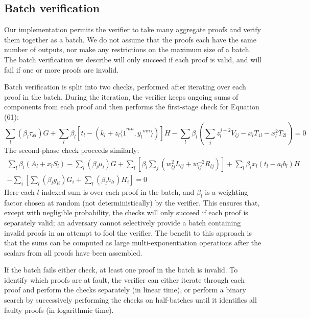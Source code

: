 \documentclass{mrl}
\begin{document}
\subsection{Batch verification}
Our implementation permits the verifier to take many aggregate proofs and verify them together as a batch. We do not assume that the proofs each have the same number of outputs, nor make any restrictions on the maximum size of a batch. The batch verification we describe will only succeed if each proof is valid, and will fail if one or more proofs are invalid.

Batch verification is split into two checks, performed after iterating over each proof in the batch. During the iteration, the verifier keeps ongoing sums of components from each proof and then performs the first-stage check for Equation (61):
\begin{equation}
\sum_l (\beta_l\tau_{xl}) G + \sum_l \beta_l\left[ t_l - (k_l + z_l \langle \overline{1}^{mn},\overline{y_l}^{mn} \rangle) \right] H - \sum_l \beta_l \left( \sum_j z_l^{j+2} V_{lj} - x_lT_{1l} - x_l^2T_{2l} \right) = 0 \nonumber
\end{equation}
The second-phase check proceeds similarly:
\begin{multline}
\sum_l \beta_l(A_l + x_lS_l) - \sum_l(\beta_l\mu_l) G + \sum_l\left[\beta_l \sum_j(w_{lj}^2 L_{lj} + w_{lj}^{-2} R_{lj})\right] + \sum_l \beta_l x_l(t_l - a_lb_l) H \\
- \sum_i \left[\sum_l(\beta_l g_{li})G_i + \sum_l(\beta_l h_{li})H_i\right] = 0 \nonumber
\end{multline}
Here each $l$-indexed sum is over each proof in the batch, and $\beta_l$ is a weighting factor chosen at random (not deterministically) by the verifier. This ensures that, except with negligible probability, the checks will only succeed if each proof is separately valid; an adversary cannot selectively provide a batch containing invalid proofs in an attempt to fool the verifier. The benefit to this approach is that the sums can be computed as large multi-exponentiation operations after the scalars from all proofs have been assembled.

If the batch fails either check, at least one proof in the batch is invalid. To identify which proofs are at fault, the verifier can either iterate through each proof and perform the checks separately (in linear time), or perform a binary search by successively performing the checks on half-batches until it identifies all faulty proofs (in logarithmic time).
\end{document}
